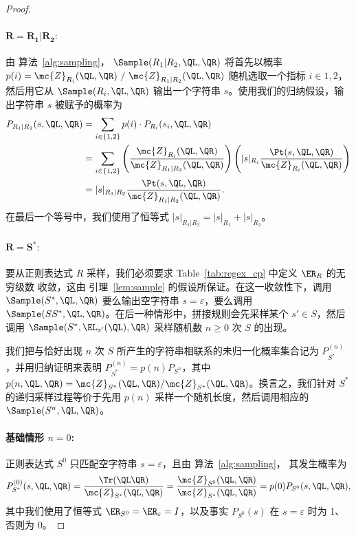 \begin{proof}
\paragraph{$\mathbf{R = R_1 | R_2:}$} 由 算法~\ref{alg:sampling}，
$\Sample(R_1 | R_2, \QL, \QR)$ 将首先以概率 $p(i) = \mc{Z}_{R_i}(\QL, \QR) \ / \ \mc{Z}_{R_1 | R_2}(\QL, \QR)$ 随机选取一个指标 $i \in {1, 2}$，然后用它从 $\Sample(R_i, \QL, \QR)$ 输出一个字符串 $s$。使用我们的归纳假设，输出字符串 $s$ 被赋予的概率为
%
\begin{align*}
    P_{R_1 | R_2}(s, \QL, \QR) &= \sum_{i \in \{1, 2\}} p(i) \cdot P_{R_i}(s_i, \QL, \QR) \\
    &= \sum_{i \in \{1, 2\}} \left( \frac{\mc{Z}_{R_i}(\QL, \QR)}{\mc{Z}_{R_1 | R_2}(\QL, \QR)} \right) \left( |s|_{R_i} \frac{\Pt(s, \QL, \QR)}{\mc{Z}_{R_i}(\QL, \QR)} \right) \\
    &= |s|_{R_1 | R_2} \frac{\Pt(s, \QL, \QR)}{\mc{Z}_{R_1 | R_2}(\QL, \QR)}.
\end{align*}
%
在最后一个等号中，我们使用了恒等式 $|s|_{R_1 | R_2} = |s|_{R_1} + |s|_{R_2}$。

\paragraph{$\mathbf{R = S^*:}$} 要从正则表达式 $R$ 采样，我们必须要求 Table~\ref{tab:regex_cp} 中定义 $\ER_R$ 的无穷级数
收敛，这由 引理~\ref{lem:sample} 的假设所保证。在这一收敛性下，调用 $\Sample(S^*, \QL, \QR)$ 要么输出空字符串 $s = \varepsilon$，要么调用 $\Sample(SS^*, \QL, \QR)$。在后一种情形中，拼接规则会先采样某个 $s' \in S$，然后调用 $\Sample(S^*, \EL_{s'}(\QL), \QR)$ 采样随机数 $n \geq 0$ 次 $S$ 的出现。

我们把与恰好出现 $n$ 次 $S$ 所产生的字符串相联系的未归一化概率集合记为 $P_{S^*}^{(n)}$，并用归纳证明来表明 $P_{S^*}^{(n)} = p(n) P_{S^n}$，其中 $p(n, \QL, \QR) = \mc{Z}_{S^n}(\QL, \QR) / \mc{Z}_{S^*}(\QL, \QR)$。换言之，我们针对 $S^*$ 的递归采样过程等价于先用 $p(n)$ 采样一个随机长度，然后调用相应的 $\Sample(S^n, \QL, \QR)$。

\paragraph{\textbf{基础情形} $n = 0$: } 正则表达式 $S^0$ 只匹配空字符串 $s = \varepsilon$，且由 算法~\ref{alg:sampling}，
其发生概率为
%
\begin{equation*}
    P_{S^*}^{(0)}(s, \QL, \QR) = \frac{\Tr(\QL \QR)}{\mc{Z}_{S^*}(\QL, \QR)} = \frac{\mc{Z}_{S^0}(\QL, \QR)}{\mc{Z}_{S^*}(\QL, \QR)} = p(0) P_{S^0}(s, \QL, \QR),
\end{equation*}
%
其中我们使用了恒等式 $\ER_{S^0} = \ER_\varepsilon = I$，以及事实 $P_{S^0}(s)$ 在 $s = \varepsilon$ 时为 1、否则为 0。


\end{proof}
